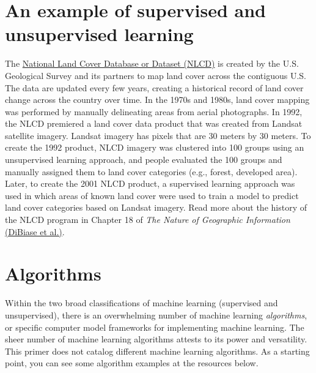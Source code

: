 \documentclass[
]{book}
\begin{document}
\hypertarget{an-example-of-supervised-and-unsupervised-learning}{%
\section{An example of supervised and unsupervised learning}\label{an-example-of-supervised-and-unsupervised-learning}}

The \href{https://www.usgs.gov/centers/eros/science/national-land-cover-database}{National Land Cover Database or Dataset (NLCD)} is created by the U.S. Geological Survey and its partners to map land cover across the contiguous U.S. The data are updated every few years, creating a historical record of land cover change across the country over time. In the 1970s and 1980s, land cover mapping was performed by manually delineating areas from aerial photographs. In 1992, the NLCD premiered a land cover data product that was created from Landsat satellite imagery. Landsat imagery has pixels that are 30 meters by 30 meters. To create the 1992 product, NLCD imagery was clustered into 100 groups using an unsupervised learning approach, and people evaluated the 100 groups and manually assigned them to land cover categories (e.g., forest, developed area). Later, to create the 2001 NLCD product, a supervised learning approach was used in which areas of known land cover were used to train a model to predict land cover categories based on Landsat imagery. Read more about the history of the NLCD program in Chapter 18 of \emph{The Nature of Geographic Information} \href{https://www.e-education.psu.edu/natureofgeoinfo/}{(DiBiase et al.)}.

\hypertarget{algorithms}{%
\section{Algorithms}\label{algorithms}}

Within the two broad classifications of machine learning (supervised and unsupervised), there is an overwhelming number of machine learning \emph{algorithms}, or specific computer model frameworks for implementing machine learning. The sheer number of machine learning algorithms attests to its power and versatility. This primer does not catalog different machine learning algorithms. As a starting point, you can see some algorithm examples at the resources below.
\end{document}
